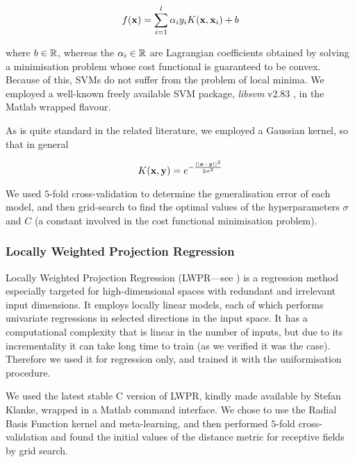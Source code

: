 \begin{equation} \label{eqn:sol}
  f(\mathbf{x}) = \sum_{i=1}^l \alpha_i y_i K(\mathbf{x},\mathbf{x}_i) + b
\end{equation}

\noindent where $b \in \mathbb{R}$, whereas the $\alpha_i \in \mathbb{R}$ are
Lagrangian coefficients obtained by solving a minimisation problem
whose cost functional is guaranteed to be convex. Because of this,
SVMs do not suffer from the problem of local minima. We employed a
well-known freely available SVM package, \emph{libsvm} v2.83
\cite{ChangL01}, in the Matlab wrapped flavour.

As is quite standard in the related literature, we employed a Gaussian
kernel, so that in general

$$ K(\mathbf{x},\mathbf{y}) = e^{-\frac{||\mathbf{x}-\mathbf{y}||^2}{2\sigma^2}} $$

We used $5$-fold cross-validation to determine the generalisation
error of each model, and then grid-search to find the optimal values
of the hyperparameters $\sigma$ and $C$ (a constant involved in the
cost functional minimisation problem).

\subsubsection{Locally Weighted Projection Regression}

Locally Weighted Projection Regression (LWPR---see \cite{lwpr}) is a
regression method especially targeted for high-dimensional
spaces with redundant and irrelevant input dimensions. It employs
locally linear models, each of which performs univariate regressions
in selected directions in the input space. It has a computational
complexity that is linear in the number of inputs, but due to its
incrementality it can take long time to train (as we verified it was
the case). Therefore we used it for regression only, and trained it
with the uniformisation procedure.

We used the latest stable C version of LWPR, kindly made available by
Stefan Klanke, wrapped in a Matlab command interface. We chose to use
the Radial Basis Function kernel and meta-learning, and then
performed $5$-fold cross-validation and found the initial values of
the distance metric for receptive fields by grid search.
